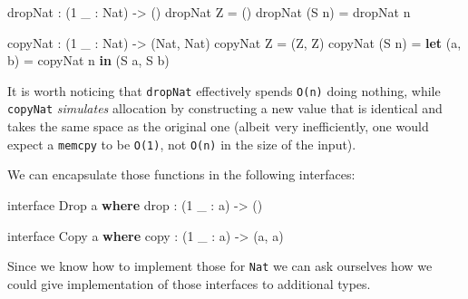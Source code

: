 \documentclass[
]{article}
\newenvironment{Shaded}{}{}
\newcommand{\DataTypeTok}[1]{\textcolor[rgb]{0.56,0.13,0.00}{#1}}
\newcommand{\DecValTok}[1]{\textcolor[rgb]{0.25,0.63,0.44}{#1}}
\newcommand{\FunctionTok}[1]{\textcolor[rgb]{0.02,0.16,0.49}{#1}}
\newcommand{\KeywordTok}[1]{\textcolor[rgb]{0.00,0.44,0.13}{\textbf{#1}}}
\newcommand{\NormalTok}[1]{#1}
\newcommand{\OperatorTok}[1]{\textcolor[rgb]{0.40,0.40,0.40}{#1}}
\newcommand{\OtherTok}[1]{\textcolor[rgb]{0.00,0.44,0.13}{#1}}
\begin{document}
\begin{Shaded}
\begin{Highlighting}[]
\NormalTok{dropNat }\OperatorTok{:}\NormalTok{ (}\DecValTok{1}\NormalTok{ \_ }\OperatorTok{:} \DataTypeTok{Nat}\NormalTok{) }\OtherTok{{-}\textgreater{}}\NormalTok{ ()}
\NormalTok{dropNat }\DataTypeTok{Z} \OtherTok{=}\NormalTok{ ()}
\NormalTok{dropNat (}\DataTypeTok{S}\NormalTok{ n) }\OtherTok{=}\NormalTok{ dropNat n}

\NormalTok{copyNat }\OperatorTok{:}\NormalTok{ (}\DecValTok{1}\NormalTok{ \_ }\OperatorTok{:} \DataTypeTok{Nat}\NormalTok{) }\OtherTok{{-}\textgreater{}}\NormalTok{ (}\DataTypeTok{Nat}\NormalTok{, }\DataTypeTok{Nat}\NormalTok{)}
\NormalTok{copyNat }\DataTypeTok{Z} \OtherTok{=}\NormalTok{ (}\DataTypeTok{Z}\NormalTok{, }\DataTypeTok{Z}\NormalTok{)}
\NormalTok{copyNat (}\DataTypeTok{S}\NormalTok{ n) }\OtherTok{=} \KeywordTok{let}\NormalTok{ (a, b) }\OtherTok{=}\NormalTok{ copyNat n }\KeywordTok{in}
\NormalTok{                    (}\DataTypeTok{S}\NormalTok{ a, }\DataTypeTok{S}\NormalTok{ b)}
\end{Highlighting}
\end{Shaded}

It is worth noticing that \texttt{dropNat} effectively spends
\texttt{O(n)} doing nothing, while \texttt{copyNat} \emph{simulates}
allocation by constructing a new value that is identical and takes the
same space as the original one (albeit very inefficiently, one would
expect a \texttt{memcpy} to be \texttt{O(1)}, not \texttt{O(n)} in the
size of the input).

We can encapsulate those functions in the following interfaces:

\begin{Shaded}
\begin{Highlighting}[]
\NormalTok{interface }\DataTypeTok{Drop}\NormalTok{ a }\KeywordTok{where}
    \FunctionTok{drop} \OperatorTok{:}\NormalTok{ (}\DecValTok{1}\NormalTok{ \_ }\OperatorTok{:}\NormalTok{ a) }\OtherTok{{-}\textgreater{}}\NormalTok{ ()}

\NormalTok{interface }\DataTypeTok{Copy}\NormalTok{ a }\KeywordTok{where}
\NormalTok{    copy }\OperatorTok{:}\NormalTok{ (}\DecValTok{1}\NormalTok{ \_ }\OperatorTok{:}\NormalTok{ a) }\OtherTok{{-}\textgreater{}}\NormalTok{ (a, a)}
\end{Highlighting}
\end{Shaded}

Since we know how to implement those for \texttt{Nat} we can ask
ourselves how we could give implementation of those interfaces to
additional types.
\end{document}
